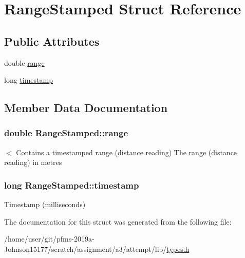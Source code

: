 \hypertarget{structRangeStamped}{}\section{Range\+Stamped Struct Reference}
\label{structRangeStamped}
\subsection*{Public Attributes}
\begin{DoxyCompactItemize}
\item 
double \hyperlink{structRangeStamped_a437c62efcfd2b3c6dc6eb9ec691146c1}{range}
\item 
long \hyperlink{structRangeStamped_ac6a16c00f75a51a9865ab98ccafbd2cc}{timestamp}
\end{DoxyCompactItemize}


\subsection{Member Data Documentation}
\subsubsection[{\texorpdfstring{range}{range}}]{\setlength{\rightskip}{0pt plus 5cm}double Range\+Stamped\+::range}\hypertarget{structRangeStamped_a437c62efcfd2b3c6dc6eb9ec691146c1}{}\label{structRangeStamped_a437c62efcfd2b3c6dc6eb9ec691146c1}
$<$ Contains a timestamped range (distance reading) The range (distance reading) in metres 
\subsubsection[{\texorpdfstring{timestamp}{timestamp}}]{\setlength{\rightskip}{0pt plus 5cm}long Range\+Stamped\+::timestamp}\hypertarget{structRangeStamped_ac6a16c00f75a51a9865ab98ccafbd2cc}{}\label{structRangeStamped_ac6a16c00f75a51a9865ab98ccafbd2cc}
Timestamp (milliseconds) 

The documentation for this struct was generated from the following file\+:\begin{DoxyCompactItemize}
\item 
/home/user/git/pfms-\/2019a-\/\+Johnson15177/scratch/assignment/a3/attempt/lib/\hyperlink{types_8h}{types.\+h}\end{DoxyCompactItemize}
